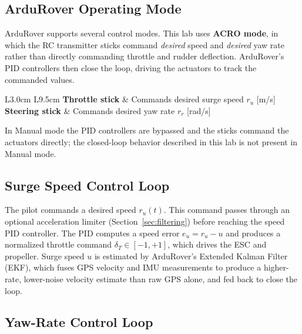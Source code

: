 \documentclass[../../book.tex]{subfiles}
\begin{document}
\subsection{ArduRover Operating Mode}

ArduRover supports several control modes.  This lab uses \textbf{ACRO mode}, in which the RC transmitter sticks command \emph{desired} speed and \emph{desired} yaw rate rather than directly commanding throttle and rudder deflection.  ArduRover's PID controllers then close the loop, driving the actuators to track the commanded values.

\begin{center}
\begin{tabular}{L{3.0cm} L{9.5cm}}
  \textbf{Throttle stick} & Commands desired surge speed $r_u$ [m/s] \\
  \textbf{Steering stick} & Commands desired yaw rate $r_r$ [rad/s] \\
\end{tabular}
\end{center}

\vspace{4pt}

In Manual mode the PID controllers are bypassed and the sticks command the actuators directly; the closed-loop behavior described in this lab is not present in Manual mode.


\subsection{Surge Speed Control Loop}
\label{sec:surge_loop}

The pilot commands a desired speed $r_u(t)$.  This command passes through an optional acceleration limiter (Section~\ref{sec:filtering}) before reaching the speed PID controller.  The PID computes a speed error $e_u = r_u - u$ and produces a normalized throttle command $\delta_T \in [-1, +1]$, which drives the ESC and propeller.  Surge speed $u$ is estimated by ArduRover's Extended Kalman Filter (EKF), which fuses GPS velocity and IMU measurements to produce a higher-rate, lower-noise velocity estimate than raw GPS alone, and fed back to close the loop.

\subsection{Yaw-Rate Control Loop}
\label{sec:yaw_loop}
\end{document}
